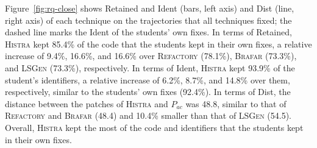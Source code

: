\documentclass[10pt,conference]{IEEEtran}
\begin{document}
Figure~\ref{fig:rq-close} shows Retained and Ident (bars, left axis) and Dist (line, right axis) of each technique on the trajectories that all techniques fixed; the dashed line marks the Ident of the students' own fixes. In terms of Retained, \textsc{Histra} kept 85.4\% of the code that the students kept in their own fixes, a relative increase of 9.4\%, 16.6\%, and 16.6\% over \textsc{Refactory} (78.1\%), \textsc{Brafar} (73.3\%), and \textsc{LSGen} (73.3\%), respectively. In terms of Ident, \textsc{Histra} kept 93.9\% of the student's identifiers, a relative increase of 6.2\%, 8.7\%, and 14.8\% over them, respectively, similar to the students' own fixes (92.4\%). In terms of Dist, the distance between the patches of \textsc{Histra} and $P_{\mathit{ac}}$ was 48.8, similar to that of \textsc{Refactory} and \textsc{Brafar} (48.4) and 10.4\% smaller than that of \textsc{LSGen} (54.5). Overall, \textsc{Histra} kept the most of the code and identifiers that the students kept in their own fixes.
\end{document}
